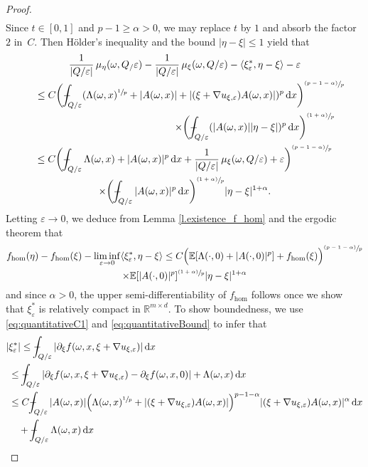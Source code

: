 \documentclass[JEP,XML,SOM,Unicode,published]{cedram}
\newcommand{\psfrac}[2]{\sfrac{(#1)}{#2}}
\theoremstyle{definition}
\def\Xint#1{\mathchoice
{\XXint\displaystyle\textstyle{#1}}%
{\XXint\textstyle\scriptstyle{#1}}%
{\XXint\scriptstyle\scriptscriptstyle{#1}}%
{\XXint\scriptscriptstyle\scriptscriptstyle{#1}}%
\!\int}
\def\XXint#1#2#3{{\setbox0=\hbox{$#1{#2#3}{\int}$ }
\vcenter{\hbox{$#2#3$ }}\kern-.57\wd0}}
\def\dashint{\Xint-}
\let\e\varepsilon
\let\w\omega
\newcommand{\dx}{\,\mathrm{d}x}
\newcommand{\R}{\mathbb{R}}
\begin{document}
\begin{proof}
\begin{multline*}
\end{multline*}
Since $t\in [0,1]$ and $p-1\geq\alpha>0$, we may replace $t$ by $1$ and absorb the factor~$2$ in~$C$. Then Hölder's inequality and the bound $|\eta-\xi|\leq 1$ yield that\vspace*{-5pt}
\begin{multline*}
\frac{1}{|Q/\e|}\,\mu_{\eta}(\w,Q_/\e)-\frac{1}{|Q/\e|}\,\mu_{\xi}(\w,Q/\e)-\langle\xi_{\e}^*,\eta-\xi\rangle-\e
\\
\hspace*{4.5mm}\leq C\biggl(\dashint_{Q/\e}(\Lambda(\w,x)^{\sfrac{1}{p}}+|A(\w,x)|+|(\xi+\nabla u_{\xi,\e})A(\w,x)|)^{p}\dx\biggr)^{\psfrac{p-1-\alpha}{p}}
\\
\shoveright{\times \biggl(\dashint_{Q/\e}(|A(\w,x)||\eta-\xi|)^p\dx\biggr)^{\psfrac{1+\alpha}{p}}}
\\
\leq C\biggl(\dashint_{Q/\e}\Lambda(\w,x)+|A(\w,x)|^p\dx+\frac{1}{|Q/\e|}\,\mu_{\xi}(\w,Q/\e)+\e\biggr)^{\psfrac{p-1-\alpha}{p}}
\\
\times\biggl(\dashint_{Q/\e}|A(\w,x)|^p\dx\biggr)^{\psfrac{1+\alpha}{p}}|\eta-\xi|^{1+\alpha}.
\end{multline*}
Letting $\e\to 0$, we deduce from Lemma \ref{l.existence_f_hom} and the ergodic theorem that\vspace*{-5pt}
\begin{multline*}
f_{\hom}(\eta)-f_{\hom}(\xi)-\liminf_{\e\to 0}\langle\xi_{\e}^*,\eta-\xi\rangle\leq C\Big(\mathbb{E}[\Lambda(\cdot,0)+|A(\cdot,0)|^p]+f_{\hom}(\xi)\Big)^{\psfrac{p-1-\alpha}{p}}
\\
\times\mathbb{E}[|A(\cdot,0)|^p]^{\psfrac{1+\alpha}{p}}|\eta-\xi|^{1+\alpha}
\end{multline*}
and since $\alpha>0$, the upper semi-differentiability of $f_{\hom}$ follows once we show that $\xi_{\e}^*$ is relatively compact in $\R^{m\times d}$. To show boundedness, we use \eqref{eq:quantitativeC1} and \eqref{eq:quantitativeBound} to infer that\vspace*{-5pt}
\begin{align*}
|&\xi_{\e}^*|\leq\dashint_{Q/\e}|\partial_{\xi}f(\w,x,\xi+\nabla u_{\xi,\e})|\dx
\\
&\leq \dashint_{Q/\e}|\partial_{\xi}f(\w,x,\xi+\nabla u_{\xi,\e})-\partial_{\xi}f(\w,x,0)|+\Lambda(\w,x)\dx
\\
&\leq C\dashint_{Q/\e}|A(\w,x)|\Big(\Lambda(\w,x)^{\sfrac{1}{p}}+|(\xi+\nabla u_{\xi,\e})A(\w,x)|\Big)^{p-1-\alpha}|(\xi+\nabla u_{\xi,\e})A(\w,x)|^{\alpha}\dx
\\
&\quad+\dashint_{Q/\e}\Lambda(\w,x)\dx

\end{align*}
\end{proof}
\end{document}
